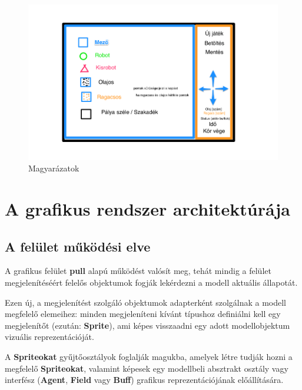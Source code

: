 \begin{figure}[h!]
\begin{center}
\includegraphics[width=17cm]{chapters/chapter11/3.png}
\caption{Magyarázatok}
\label{fig:Grafikus}
\end{center}
\end{figure}

\section{A grafikus rendszer architektúrája}

\subsection{A felület működési elve}
\noindent A grafikus felület \textbf{pull} alapú működést valósít meg, tehát mindig a felület megjelenítéséért felelős objektumok fogják lekérdezni a modell aktuális állapotát. 

\noindent Ezen új, a megjelenítést szolgáló objektumok adapterként szolgálnak a modell megfelelő elemeihez: minden megjeleníteni kívánt típushoz definiálni kell egy megjelenítőt (ezután: \textbf{Sprite}), ami képes visszaadni egy adott modellobjektum vizuális reprezentációját. 

\noindent A \textbf{Spriteokat} gyűjtőosztályok
foglalják magukba, amelyek létre tudják hozni a megfelelő \textbf{Spriteokat}, valamint képesek egy modellbeli absztrakt osztály vagy interfész (\textbf{Agent}, \textbf{Field} vagy \textbf{Buff}) grafikus reprezentációjának előállítására. 

